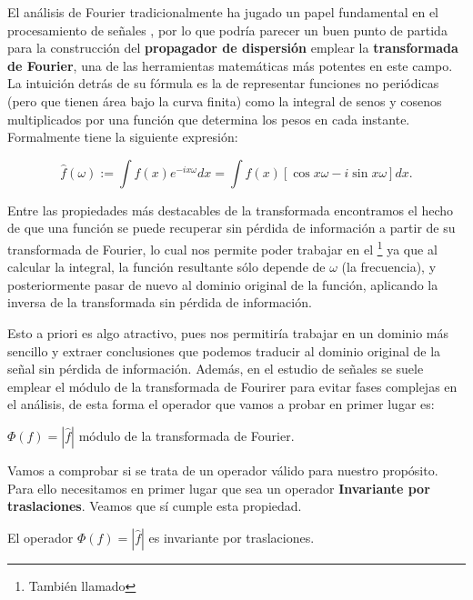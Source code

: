 \noindent El análisis de Fourier tradicionalmente ha jugado un papel fundamental en el procesamiento de señales \cite{DigitalImageProcessing}, por lo que podría parecer un buen punto de partida para la construcción del \textbf{propagador de dispersión} emplear la \textbf{transformada de Fourier}, una de las herramientas matemáticas más potentes en este campo. La intuición detrás de su fórmula es la de representar funciones no periódicas (pero que tienen área bajo la curva finita) como la integral de senos y cosenos multiplicados por una función que determina los pesos en cada instante. Formalmente tiene la siguiente expresión:

\begin{equation}
\widehat{f}(\omega):= \int{f(x)e^{-ix\omega}dx}=\int{f(x)\left[\cos{x\omega} -i\sin{x\omega}\right]dx}.
\end{equation}

\noindent Entre las propiedades más destacables de la transformada encontramos el hecho de que una función se puede recuperar sin pérdida de información a partir de su transformada de Fourier, lo cual nos permite poder trabajar en el \footnote{También llamado } ya que al calcular la integral, la función resultante sólo depende de $\omega$ (la frecuencia), y posteriormente pasar de nuevo al dominio original de la función, aplicando la inversa de la transformada sin pérdida de información.

\medskip

\noindent Esto a priori es algo atractivo, pues nos permitiría trabajar en un dominio más sencillo y extraer conclusiones que podemos traducir al dominio original de la señal sin pérdida de información. Además, en el estudio de señales se suele emplear el módulo de la transformada de Fourirer para evitar fases complejas en el análisis, de esta forma el operador que vamos a probar en primer lugar es: 

\begin{definicion}
$\Phi(f)=|\widehat{f}|$ módulo de la transformada de Fourier. 
\end{definicion}

\noindent Vamos a comprobar si se trata de un operador válido para nuestro propósito. Para ello necesitamos en primer lugar que sea un operador \textbf{Invariante por traslaciones}. Veamos  que sí cumple esta propiedad.

\begin{lema} \label{lema::invarianza_traslaciones}
    El operador $\Phi(f)=|\widehat{f}|$ es invariante por traslaciones.
\end{lema}

